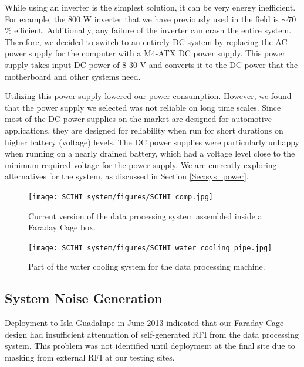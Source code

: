 While using an inverter is the simplest solution, it can be very energy inefficient. For example, the 800 W inverter that we have previously used in the field is $\sim70$\% efficient. Additionally, any failure of the inverter can crash the entire system. Therefore, we decided to switch to an entirely DC system by replacing the AC power supply for the computer with a M4-ATX DC power supply. This power supply takes input DC power of 8-30 V and converts it to the DC power that the motherboard and other systems need. 

Utilizing this power supply lowered our power consumption. However, we found that the power supply we selected was not reliable on long time scales. Since most of the DC power supplies on the market are designed for automotive applications, they are designed for reliability when run for short durations on higher battery (voltage) levels. The DC power supplies were particularly unhappy when running on a nearly drained battery, which had a voltage level close to the minimum required voltage for the power supply. We are currently exploring alternatives for the system, as discussed in Section \ref{Sec:sys_power}. 

\begin{figure}[htb]
\centering
\begin{minipage}[b]{0.52\textwidth}
\centering
\texttt{[image: SCIHI\_system/figures/SCIHI\_comp.jpg]}
\caption{Current version of the data processing system assembled inside a Faraday Cage box.}
\label{Fig:new_comp}
\end{minipage}%
\begin{minipage}[b]{0.02\textwidth}
\hspace{1cm}
\end{minipage}%
\begin{minipage}[b]{0.42\textwidth}
\centering
\texttt{[image: SCIHI\_system/figures/SCIHI\_water\_cooling\_pipe.jpg]}
\caption{Part of the water cooling system for the data processing machine.}
\label{Fig:water_pipe}
\end{minipage}
\end{figure}


\subsection{System Noise Generation} \label{Sec:sys_noise}

Deployment to Isla Guadalupe in June 2013 indicated that our Faraday Cage design had insufficient attenuation of self-generated RFI from the data processing system. This problem was not identified until deployment at the final site due to masking from external RFI at our testing sites. 

